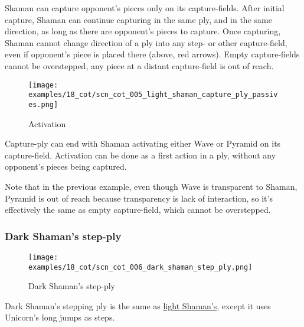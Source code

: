 \vspace*{-0.4\baselineskip}
Shaman can capture opponent's pieces only on its capture-fields. After initial capture,
Shaman can continue capturing in the same ply, and in the same direction, as long as
there are opponent's pieces to capture. Once capturing, Shaman cannot change direction
of a ply into any step- or other capture-field, even if opponent's piece is placed
there (above, red arrows). Empty capture-fields cannot be overstepped, any piece at
a distant capture-field is out of reach.

\noindent
\begin{wrapfigure}[6]{l}{0.4\textwidth}
\centering
\texttt{[image: examples/18\_cot/scn\_cot\_005\_light\_shaman\_capture\_ply\_passives.png]}
\vspace*{-1.4\baselineskip}
\caption{Activation}
\label{fig:scn_cot_005_light_shaman_capture_ply_passives}
\end{wrapfigure}
Capture-ply can end with Shaman activating either Wave or Pyramid on its capture-field.
Activation can be done as a first action in a ply, without any opponent's pieces being
captured.

Note that in the previous example, even though Wave is transparent to Shaman, Pyramid
is out of reach because transparency is lack of interaction, so it's effectively the
same as empty capture-field, which cannot be overstepped.

\clearpage %

\subsubsection*{Dark Shaman's step-ply}
\label{sec:Conquest of Tlalocan/Shaman/Movement/Dark Shaman's step-ply}

\vspace*{-1.4\baselineskip}
\noindent
\begin{figure}[!h]
\texttt{[image: examples/18\_cot/scn\_cot\_006\_dark\_shaman\_step\_ply.png]}
\vspace*{-1.4\baselineskip}
\caption{Dark Shaman's step-ply}
\label{fig:scn_cot_006_dark_shaman_step_ply}
\end{figure}

\vspace*{-0.4\baselineskip}
Dark Shaman's stepping ply is the same as
\hyperref[fig:scn_cot_002_light_shaman_step_ply]{light Shaman's}, except it uses
Unicorn's long jumps as steps.

